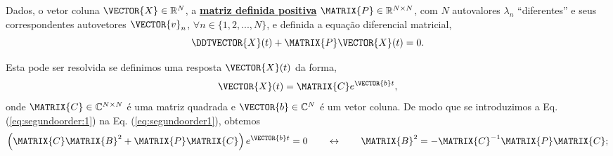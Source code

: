 \begin{myproofT}\label{proof:theo:differential-eq:0}
Dados, o vetor coluna $\VECTOR{X} \in \mathbb{R}^N$, 
a \hyperref[def:positivematrix0]{\textbf{matriz definida positiva}} $\MATRIX{P} \in \mathbb{R}^{N\times N}$,
com $N$ autovalores $\lambda_n$ ``diferentes'' e seus correspondentes autovetores $\VECTOR{v}_n$,
$\forall n \in \{1, 2, ..., N\}$, 
e definida a equação diferencial matricial,
\begin{equation}\label{eq:segundoorder1}
\DDTVECTOR{X}(t) + \MATRIX{P} \VECTOR{X}(t)=0.
\end{equation}

Esta pode ser resolvida se definimos uma resposta $\VECTOR{X}(t)$ da forma, 
\begin{equation}\label{eq:segundoorder:1}
\VECTOR{X}(t)=\MATRIX{C}e^{\VECTOR{b}t},
\end{equation}
onde $\MATRIX{C} \in \mathbb{C}^{N\times N}$ é uma matriz quadrada e $\VECTOR{b} \in \mathbb{C}^{N}$ é um vetor coluna.
De modo que se introduzimos a Eq. (\ref{eq:segundoorder:1}) na Eq. (\ref{eq:segundoorder1}),
obtemos 
\begin{equation}\label{eq:segundoorder:2}
\left(\MATRIX{C}\MATRIX{B}^2+\MATRIX{P}\MATRIX{C}\right)e^{\VECTOR{b}t} = 0 
\qquad \leftrightarrow \qquad
\MATRIX{B}^2=-\MATRIX{C}^{-1}\MATRIX{P}\MATRIX{C};
\end{equation}


\end{myproofT}
